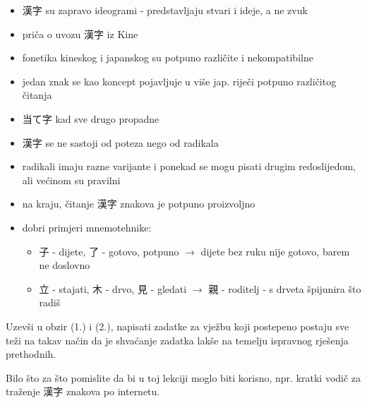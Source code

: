 	\begin{itemize}
		\itemsep-5pt
		\item 漢字 su zapravo ideogrami - predstavljaju stvari i ideje, a ne zvuk
		\item priča o uvozu 漢字 iz Kine
		\item fonetika kineskog i japanskog su potpuno različite i nekompatibilne
		\item jedan znak se kao koncept pojavljuje u više jap. riječi potpuno različitog čitanja
		\item 当て字 kad sve drugo propadne
		\item 漢字 se ne sastoji od poteza nego od radikala
		\item radikali imaju razne varijante i ponekad se mogu pisati drugim redoslijedom, ali većinom su pravilni
		\item na kraju, čitanje 漢字 znakova je potpuno proizvoljno
		\item dobri primjeri mnemotehnike:
		\begin{itemize}
			\itemsep-5pt
			\item 子 - dijete, 了 - gotovo, potpuno $\rightarrow$ dijete bez ruku nije gotovo, barem ne doslovno
			\item 立 - stajati, 木 - drvo, 見 - gledati $\rightarrow$ 親 - roditelj - s drveta špijunira što radiš
		\end{itemize}
	\end{itemize}

	
	Uzevši u obzir (1.) i (2.), napisati zadatke za vježbu koji postepeno postaju sve teži na takav način da je shvaćanje zadatka lakše na temelju ispravnog rješenja prethodnih.
	
	
	Bilo što za što pomislite da bi u toj lekciji moglo biti korisno, npr. kratki vodič za traženje 漢字 znakova po internetu.
	
